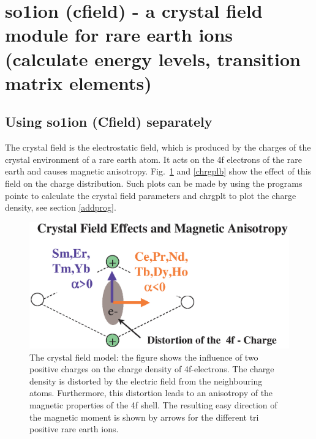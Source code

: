 \section{{\prg so1ion} ({\prg cfield}) - a crystal field module for rare earth %
ions (calculate energy levels, transition matrix elements)}\label{cfield}

\subsection{Using {\prg so1ion} ({\prg Cfield}) separately}
\label{cfieldsep}

The crystal field is the electrostatic field, which is produced by the
charges of the crystal environment of a rare earth atom. It acts on the
4f electrons of the rare earth and causes magnetic anisotropy. Fig.~\ref{chrgpla} and
\ref{chrgplb} show the effect of this field on the charge distribution.
Such plots can be made by using the programs {\prg pointc} to calculate
the crystal field parameters and
 {\prg chrgplt} to plot the charge density, see section \ref{addprog}.

\begin{figure}[hb]
\includegraphics[angle=0,width=0.7\columnwidth]{./figsrc/crystalfieldplot.eps}
\caption{\label{chrgpla}
The crystal field model: the figure shows the influence of two positive 
charges on the charge density of 4f-electrons. The
charge density is distorted by the electric field from the neighbouring atoms.
Furthermore, this distortion leads to an anisotropy of the magnetic properties
of the 4f shell. The resulting 
easy direction of the magnetic moment is shown by arrows for the different tri positive
rare earth ions.} 
\end{figure}

